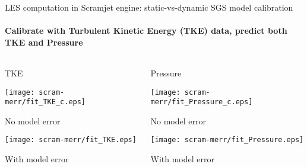 \begin{frame}[c]{\small{LES computation in Scramjet engine: static-vs-dynamic SGS model calibration}}
\framesubtitle{Calibrate with Turbulent Kinetic Energy (TKE) data, predict both TKE and Pressure}
\label{les_merr}
\footnotesize

\vspace*{-12mm}
\begin{columns}[t]
\begin{column}{0.5\textwidth}
\vspace*{0mm}\centerline{TKE}
\texttt{[image: scram-merr/fit\_TKE\_c.eps]}\\
\vspace*{-17mm}\centerline{No model error}\vspace*{13mm}
\texttt{[image: scram-merr/fit\_TKE.eps]}\\
\vspace*{-16mm}\centerline{With model error}
\end{column}

\begin{column}{0.5\textwidth}
\vspace*{0mm}\centerline{Pressure}
\texttt{[image: scram-merr/fit\_Pressure\_c.eps]}\\
\vspace*{-16mm}\centerline{No model error}\vspace*{12mm}
\texttt{[image: scram-merr/fit\_Pressure.eps]}\\
\vspace*{-15mm}\centerline{With model error}
\end{column}
\end{columns}



\end{frame}


